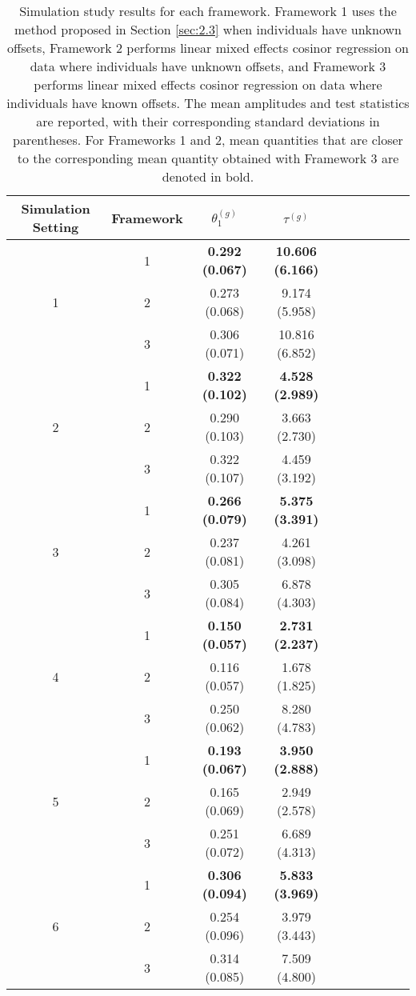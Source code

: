 \begin{table*}[!h]
	\caption{Simulation study results for each framework. Framework 1 uses the method proposed in Section \ref{sec:2.3} when individuals have unknown offsets, Framework 2 performs linear mixed effects cosinor regression on data where individuals have unknown offsets, and Framework 3 performs linear mixed effects cosinor regression on data where individuals have known offsets. The mean amplitudes and test statistics are reported, with their corresponding standard deviations in parentheses. For Frameworks 1 and 2, mean quantities that are closer to the corresponding mean quantity obtained with Framework 3 are denoted in bold.} \label{tab:sim1}
 \centering
		\begin{tabular}{|c|c|c|c|c|c|c|c|c|c|}
			\hline
   Simulation Setting & Framework  & $\theta_{1}^{(g)}$  & $\tau^{(g)}$ \\
   \hline
         \multirow{3}{*}{1} &  1 & \textbf{0.292 (0.067)} & \textbf{10.606 (6.166)} \\
                            &  2 & 0.273 (0.068) & 9.174 (5.958) \\
                            &  3 & 0.306 (0.071) & 10.816 (6.852) \\
         \hline 
         \multirow{3}{*}{2} &  1 & \textbf{0.322 (0.102)} & \textbf{4.528 (2.989)} \\
                            &  2 & 0.290 (0.103) & 3.663 (2.730) \\
                            & 3 & 0.322 (0.107) & 4.459 (3.192) \\
         \hline 
         \multirow{3}{*}{3}& 1 & \textbf{0.266 (0.079)} & \textbf{5.375 (3.391)} \\
                           &  2 & 0.237 (0.081) & 4.261 (3.098) \\
                           & 3 & 0.305 (0.084) & 6.878 (4.303) \\
         \hline 
         \multirow{3}{*}{4} & 1 & \textbf{0.150 (0.057)} & \textbf{2.731 (2.237)} \\
                            & 2 & 0.116 (0.057) & 1.678 (1.825) \\
                            & 3 & 0.250 (0.062) & 8.280 (4.783) \\
         \hline 
         \multirow{3}{*}{5} &  1 & \textbf{0.193 (0.067)} & \textbf{3.950 (2.888)} \\
                            &  2 & 0.165 (0.069) & 2.949 (2.578) \\
                            &  3 & 0.251 (0.072) & 6.689 (4.313) \\
         \hline 
         \multirow{3}{*}{6} & 1 & \textbf{0.306 (0.094)} & \textbf{5.833 (3.969)} \\
                            &  2 & 0.254 (0.096) & 3.979 (3.443) \\
                            &  3 &  0.314 (0.085) & 7.509 (4.800) \\
         \hline 
\end{tabular} \end{table*}

